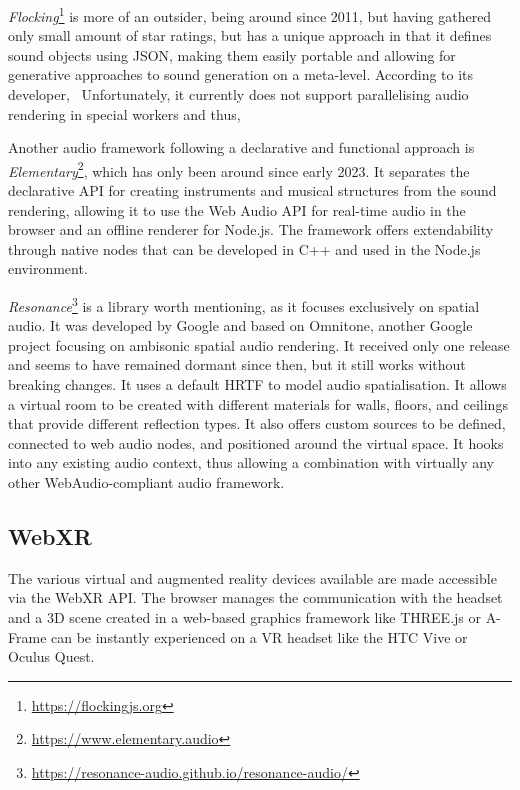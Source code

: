 \emph{Flocking}\footnote{\url{https://flockingjs.org}} is more of an outsider, being around since 2011, but having gathered only small amount of star ratings, but has a unique approach in that it defines sound objects using \ac{JSON}, making them easily portable and allowing for generative approaches to sound generation on a meta-level.
According to its developer,~ Unfortunately, it currently does not support parallelising audio rendering in special workers and thus,~

Another audio framework following a declarative and functional approach is \emph{Elementary}\footnote{\url{https://www.elementary.audio}}, which has only been around since early 2023.
It separates the declarative \ac{API} for creating instruments and musical structures from the sound rendering, allowing it to use the Web Audio \ac{API} for real-time audio in the browser and an offline renderer for Node.js.
The framework offers extendability through native nodes that can be developed in C++ and used in the Node.js environment.

\emph{Resonance}\footnote{\url{https://resonance-audio.github.io/resonance-audio/}} is a library worth mentioning, as it focuses exclusively on spatial audio.
It was developed by Google and based on Omnitone, another Google project focusing on ambisonic spatial audio rendering.
It received only one release and seems to have remained dormant since then, but it still works without breaking changes.
It uses a default \ac{HRTF} to model audio spatialisation.
It allows a virtual room to be created with different materials for walls, floors, and ceilings that provide different reflection types.
It also offers custom sources to be defined, connected to web audio nodes, and positioned around the virtual space.
It hooks into any existing audio context, thus allowing a combination with virtually any other WebAudio-compliant audio framework.

\subsection{WebXR}

The various virtual and augmented reality devices available are made accessible via the WebXR \ac{API}.
The browser manages the communication with the headset and a \ac{3D} scene created in a web-based graphics framework like THREE.js or A-Frame can be instantly experienced on a \ac{VR} headset like the HTC Vive or Oculus Quest.

